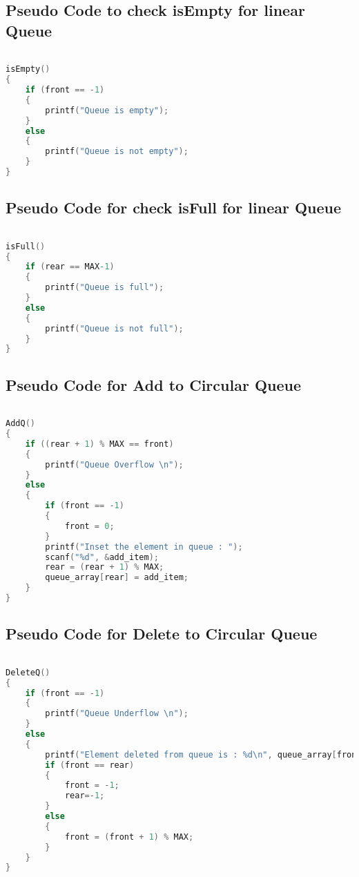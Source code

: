 \documentclass[11pt]{article}
\begin{document}
\subsection{Pseudo Code to check isEmpty for linear Queue}

\begin{lstlisting}[language=C]

isEmpty()
{
	if (front == -1)
	{
		printf("Queue is empty");
	}
	else
	{
		printf("Queue is not empty");
	}
}

\end{lstlisting}

\subsection{Pseudo Code for check isFull for linear Queue}

\begin{lstlisting}[language=C]

isFull()
{
	if (rear == MAX-1)
	{
		printf("Queue is full");
	}
	else
	{
		printf("Queue is not full");
	}
}

\end{lstlisting}


\subsection{Pseudo Code for Add to Circular Queue}

\begin{lstlisting}[language=C]

AddQ()
{
	if ((rear + 1) % MAX == front)
	{
		printf("Queue Overflow \n");
	}
	else
	{
		if (front == -1)
		{
			front = 0;
		}
		printf("Inset the element in queue : ");
		scanf("%d", &add_item);
		rear = (rear + 1) % MAX;
		queue_array[rear] = add_item;
	}
}

\end{lstlisting}


\subsection{Pseudo Code for Delete to Circular Queue}

\begin{lstlisting}[language=C]

DeleteQ()
{
	if (front == -1)
	{
		printf("Queue Underflow \n");
	}
	else
	{
		printf("Element deleted from queue is : %d\n", queue_array[front]);
		if (front == rear)
		{
			front = -1;
			rear=-1;
		}
		else
		{
			front = (front + 1) % MAX;
		}
	}
}

\end{lstlisting}
\end{document}
